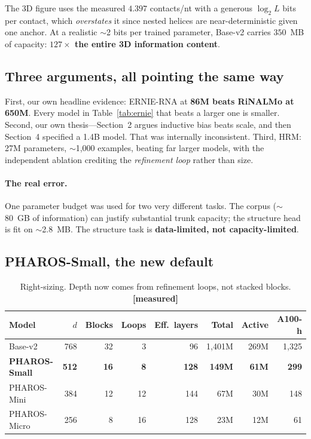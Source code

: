 \documentclass[11pt,a4paper]{article}
\newcommand{\meas}{\textcolor{measured}{\textbf{[measured]}}}
\begin{document}
The 3D figure uses the measured $4.397$ contacts/nt with a generous $\log_2 L$
bits per contact, which \emph{overstates} it since nested helices are
near-deterministic given one anchor. At a realistic $\sim$2 bits per trained
parameter, Base-v2 carries $350$~MB of capacity: \textbf{$127\times$ the entire
3D information content}.

\subsection{Three arguments, all pointing the same way}

First, our own headline evidence: ERNIE-RNA at \textbf{86M beats RiNALMo at
650M}. Every model in Table~\ref{tab:ernie} that beats a larger one is smaller.
Second, our own thesis---Section~2 argues inductive bias beats scale, and then
Section~4 specified a 1.4B model. That was internally inconsistent. Third, HRM:
27M parameters, $\sim$1{,}000 examples, beating far larger models, with the
independent ablation crediting the \emph{refinement loop} rather than size.

\paragraph{The real error.} One parameter budget was used for two very different
tasks. The corpus ($\sim$80~GB of information) can justify substantial trunk
capacity; the structure head is fit on $\sim$2.8~MB. The structure task is
\textbf{data-limited, not capacity-limited}.

\subsection{PHAROS-Small, the new default}

\begin{table}[h]
\centering
\caption{Right-sizing. Depth now comes from refinement loops, not stacked blocks. \meas}
\small
\begin{tabular}{@{}lrrrrrrr@{}}
\toprule
\textbf{Model} & \textbf{$d$} & \textbf{Blocks} & \textbf{Loops} & \textbf{Eff.\ layers} & \textbf{Total} & \textbf{Active} & \textbf{A100-h} \\
\midrule
Base-v2 & 768 & 32 & 3 & 96 & 1{,}401M & 269M & 1{,}325 \\
\textbf{PHAROS-Small} & \textbf{512} & \textbf{16} & \textbf{8} & \textbf{128} & \textbf{149M} & \textbf{61M} & \textbf{299} \\
PHAROS-Mini & 384 & 12 & 12 & 144 & 67M & 30M & 148 \\
PHAROS-Micro & 256 & 8 & 16 & 128 & 23M & 12M & 61 \\
\bottomrule
\end{tabular}
\end{table}
\end{document}
